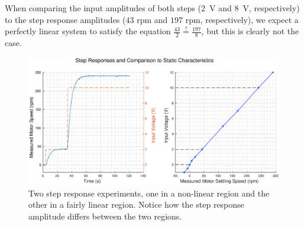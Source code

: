 When  comparing  the  input  amplitudes  of   both  steps  (\SI{2}{\volt}  and
\SI{8}{\volt}, respectively) to the  step  response  amplitudes  ($43$ rpm and
$197$ rpm, respectively), we expect a perfectly linear system  to  satisfy the
equation $\frac{43}{2} \stackrel{?}{=} \frac{197}{8}$, but this is clearly not
the case.

\begin{figure}
    \centering
    \includegraphics[width=\linewidth]{images/step_response}
    \caption{Two step response experiments, one in a non-linear region and the other in a fairly linear region. Notice how the step response amplitude differs between the two regions.}
    \label{fig:step_responses}
\end{figure}

